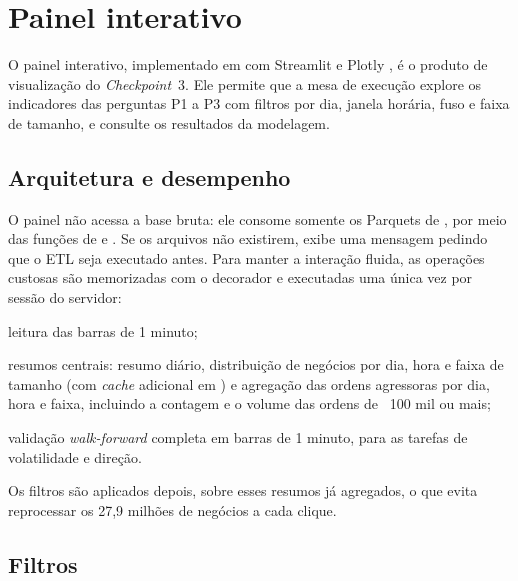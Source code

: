\chapter{Painel interativo}\label{cap:dashboard}

O painel interativo, implementado em  com Streamlit
\cite{streamlit2026} e Plotly \cite{plotly2015}, é o produto de visualização do
\textit{Checkpoint}~3. Ele permite que a mesa de execução explore os indicadores
das perguntas P1 a P3 com filtros por dia, janela horária, fuso e faixa de
tamanho, e consulte os resultados da modelagem.

\section{Arquitetura e desempenho}\label{sec:dasharquitetura}

O painel não acessa a base bruta: ele consome somente os Parquets de
, por meio das funções de  e
. Se os arquivos não existirem, exibe uma mensagem pedindo
que o ETL seja executado antes. Para manter a interação fluida, as operações
custosas são memorizadas com o decorador  e executadas uma
única vez por sessão do servidor:

\begin{alineas}
  \item leitura das barras de 1 minuto;
  \item resumos centrais: resumo diário, distribuição de negócios por dia, hora e
        faixa de tamanho (com \textit{cache} adicional em
        ) e agregação das ordens agressoras por
        dia, hora e faixa, incluindo a contagem e o volume das ordens de
        \usd~100 mil ou mais;
  \item validação \textit{walk-forward} completa em barras de 1 minuto, para as
        tarefas de volatilidade e direção.
\end{alineas}

Os filtros são aplicados depois, sobre esses resumos já agregados, o que evita
reprocessar os 27,9 milhões de negócios a cada clique.

\section{Filtros}\label{sec:filtros}

